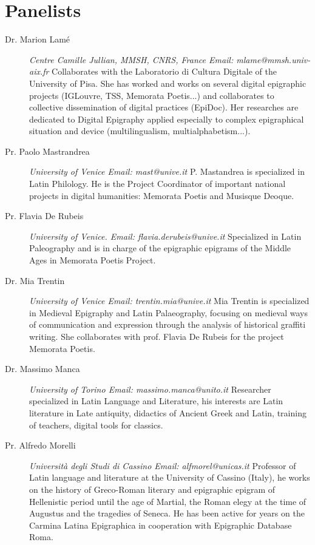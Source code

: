 \documentclass[amsthm,ebook]{saparticle}
\begin{document}
\section{Panelists}
\begin{description}
\item[Dr. Marion Lam\'e]\emph{Centre Camille Jullian, MMSH, CNRS, France Email: mlame@mmsh.univ-aix.fr} Collaborates with the Laboratorio di Cultura Digitale of the University of Pisa. She has worked and works on several digital epigraphic projects (IGLouvre, TSS, Memorata Poetis...) and collaborates to collective dissemination of digital practices (EpiDoc). Her researches are dedicated to Digital Epigraphy applied especially to complex epigraphical situation and device (multilingualism, multialphabetism...).

\item[Pr. Paolo Mastrandrea] \emph{University of Venice Email: mast@unive.it}
P. Mastandrea is specialized in Latin Philology. He is the Project Coordinator of important national projects in digital humanities: Memorata Poetis and Musisque Deoque.


\item[Pr. Flavia De Rubeis] \emph{University of Venice.
Email: flavia.derubeis@unive.it} Specialized in Latin Paleography and is in charge of the epigraphic epigrams of the Middle Ages in Memorata Poetis Project.

\item[Dr. Mia Trentin] \emph{University of Venice Email: trentin.mia@unive.it} Mia Trentin is specialized in Medieval Epigraphy and Latin Palaeography, focusing on medieval ways of communication and expression through the analysis of historical graffiti writing. She collaborates with prof. Flavia De Rubeis for the project Memorata Poetis.

\item[Dr. Massimo Manca] \emph{University of Torino
Email: massimo.manca@unito.it} Researcher specialized in Latin Language and Literature, his interests are Latin literature in Late antiquity, didactics of Ancient Greek and Latin, training of teachers, digital tools 
for classics.

\item[Pr. Alfredo Morelli] \emph{Università degli Studi di Cassino Email: alfmorel@unicas.it} Professor of Latin language and literature at the University of Cassino (Italy), he works on the history of Greco-Roman literary and epigraphic epigram of Hellenistic period until the age of Martial, the Roman elegy at the time of Augustus and the tragedies of Seneca. He has been active for years on the Carmina Latina Epigraphica in cooperation with Epigraphic Database Roma.


\end{description}
\end{document}
